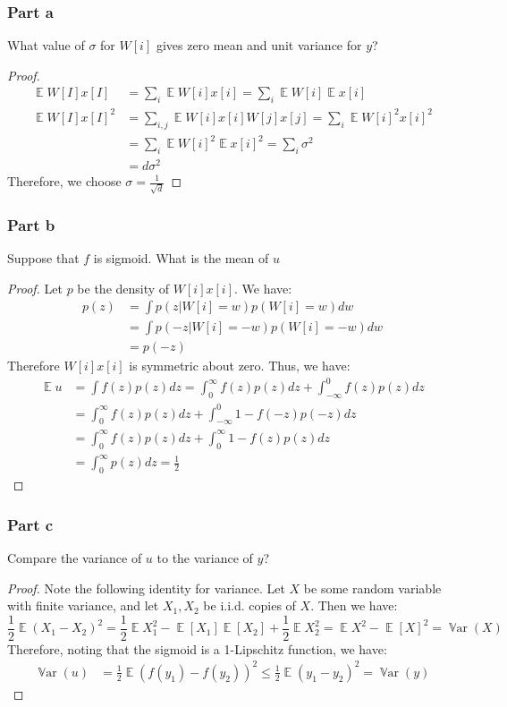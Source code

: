 \documentclass{amsart}
\DeclareMathOperator{\Var}{\mathbb{V}ar}  %
\DeclareMathOperator{\ee}{\mathbb{E}}
\theoremstyle{definition}
\begin{document}
\subsubsection*{Part a} What value of $\sigma$ for $W[i]$ gives zero mean and unit variance for $y$?
\begin{proof}
  \begin{align*}
    \ee{W[I]x[I]} &= \sum_{i} \ee{W[i]x[i]} = \sum_{i} \ee{W[i]}\ee{x[i]}\\
    \ee{W[I]x[I]^2} &= \sum_{i,j} \ee{W[i]x[i]W[j]x[j]} = \sum_{i} \ee{W[i]^2x[i]^2} \\
    &= \sum_{i} \ee{W[i]^2}\ee{x[i]^2} = \sum_{i} \sigma^2\\
    &= d \sigma^2
  \end{align*}
  Therefore, we choose $\sigma = \frac1{\sqrt{d}}$
\end{proof}
\subsubsection*{Part b} Suppose that $f$ is sigmoid. What is the mean of $u$
\begin{proof}
  Let $p$ be the density of $W[i]x[i]$. We have:
  \begin{align*}
    p(z) &= \int p(z | W[i] = w) p(W[i] = w) dw \\
    &= \int p(-z | W[i] = - w) p(W[i] = -w) dw \\
    &= p(-z)
  \end{align*}
  Therefore $W[i]x[i]$ is symmetric about zero. Thus, we have:
  \begin{align*}
    \ee{u} &= \int f(z) p(z) dz  = \int_0^\infty f(z) p(z) dz + \int_{-\infty}^0 f(z) p(z) dz \\ 
    &= \int_0^\infty f(z) p(z) dz + \int_{-\infty}^ 0 1 - f(-z) p(-z) dz \\
    &= \int_0^\infty f(z) p(z) dz + \int_0^\infty 1 - f(z) p(z) dz \\
    &= \int_0^\infty p(z) dz = \frac12
  \end{align*}
\end{proof}

\subsubsection*{Part c} Compare the variance of $u$ to the variance of $y$?
\begin{proof}
  Note the following identity for variance. Let $X$ be some random variable with finite variance, and let $X_1, X_2$ be i.i.d. copies of $X$. Then we have:
  \[
  \frac12 \ee{(X_1 - X_2)^2 } = \frac12 \ee{X_1^2} - \ee[X_1]\ee[X_2] + \frac12 \ee{X_2^2} = \ee{X^2} - \ee[X]^2 = \Var(X)
  \]
  Therefore, noting that the sigmoid is a 1-Lipschitz function, we have:
  \begin{align*}
    \Var(u) &= \frac12 \ee{(f(y_1) - f(y_2))^2} \le \frac12 \ee{(y_1 - y_2)^2} = \Var(y)
  \end{align*}
\end{proof}
\end{document}
